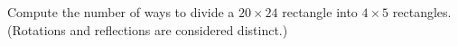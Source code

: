 Compute the number of ways to divide a $20 \times 24$ rectangle into $4 \times 5$ rectangles. (Rotations and reflections are considered distinct.)
